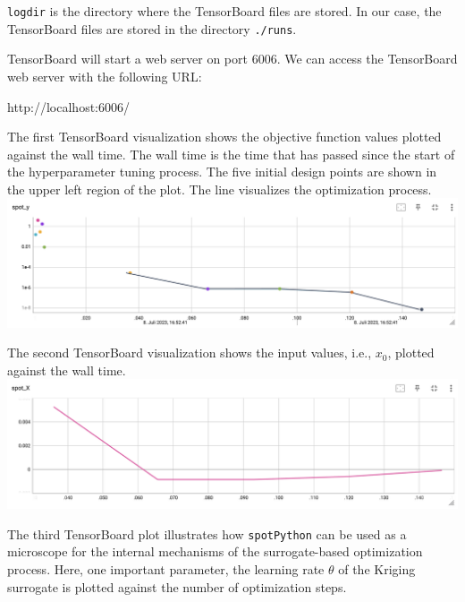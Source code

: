 \documentclass[
  letterpaper,
  DIV=11,
  numbers=noendperiod]{scrreprt}
\newenvironment{Shaded}{\begin{snugshade}}{\end{snugshade}}
\newcommand{\NormalTok}[1]{\textcolor[rgb]{0.00,0.23,0.31}{#1}}
\begin{document}
\texttt{logdir} is the directory where the TensorBoard files are stored.
In our case, the TensorBoard files are stored in the directory
\texttt{./runs}.

TensorBoard will start a web server on port 6006. We can access the
TensorBoard web server with the following URL:

\begin{Shaded}
\begin{Highlighting}[]
\NormalTok{http://localhost:6006/}
\end{Highlighting}
\end{Shaded}

The first TensorBoard visualization shows the objective function values
plotted against the wall time. The wall time is the time that has passed
since the start of the hyperparameter tuning process. The five initial
design points are shown in the upper left region of the plot. The line
visualizes the optimization process.
\includegraphics{figures_static/01_tensorboard_01.png}

The second TensorBoard visualization shows the input values, i.e.,
\(x_0\), plotted against the wall time.
\includegraphics{figures_static/01_tensorboard_02.png}

The third TensorBoard plot illustrates how \texttt{spotPython} can be
used as a microscope for the internal mechanisms of the surrogate-based
optimization process. Here, one important parameter, the learning rate
\(\theta\) of the Kriging surrogate is plotted against the number of
optimization steps.
\end{document}

